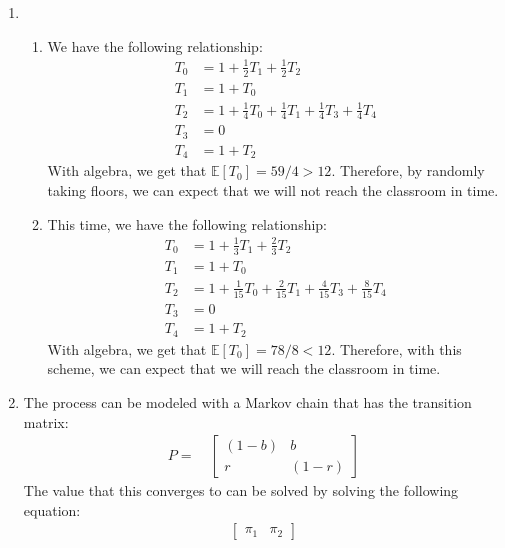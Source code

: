 \documentclass[a4paper]{article}
\newcommand{\E}{\mathbb{E}}
\newcommand{\<}{\langle}
\renewcommand{\>}{\rangle}
\renewcommand{\^}{\wedge}
\begin{document}
\begin{enumerate}
   \item
        \begin{enumerate}
            \item We have the following relationship:
                \begin{align*}
                    T_0 &= 1 + \frac{1}{2}T_1 + \frac{1}{2}T_2 \\
                    T_1 &= 1 + T_0 \\
                    T_2 &= 1 + \frac{1}{4}T_0 + \frac{1}{4}T_1 + \frac{1}{4}T_3 + \frac{1}{4}T_4 \\
                    T_3 &= 0 \\
                    T_4 &= 1 + T_2
                \end{align*}
                With algebra, we get that $\E[T_0] = 59/4 > 12$. Therefore, by randomly taking floors, we can expect that we will not reach the classroom in time.
            \item This time, we have the following relationship:
                \begin{align*}
                    T_0 &= 1 + \frac{1}{3}T_1 + \frac{2}{3}T_2 \\
                    T_1 &= 1 + T_0 \\
                    T_2 &= 1 + \frac{1}{15}T_0 + \frac{2}{15}T_1 + \frac{4}{15}T_3 + \frac{8}{15}T_4 \\
                    T_3 &= 0 \\
                    T_4 &= 1 + T_2
                \end{align*}
                With algebra, we get that $\E[T_0] = 78/8 < 12$. Therefore, with this scheme, we can expect that we will reach the classroom in time.
        \end{enumerate}
    \item The process can be modeled with a Markov chain that has the transition matrix:
        \begin{align*}
            P = \quad 
                \begin{bmatrix}
                (1-b) & b \\
                r & (1-r)
                \end{bmatrix}
        \end{align*}
        The value that this converges to can be solved by solving the following equation:
        \begin{align*}
                \begin{bmatrix}
                \pi_1 & \pi_2

\end{bmatrix}
\end{align*}
\end{enumerate}
\end{document}
